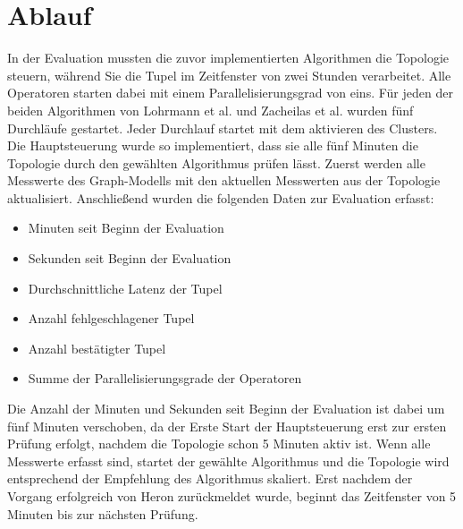 \section{Ablauf}

In der Evaluation mussten die zuvor implementierten Algorithmen die Topologie steuern, während Sie die Tupel im Zeitfenster von zwei Stunden verarbeitet.
Alle Operatoren starten dabei mit einem Parallelisierungsgrad von eins.
Für jeden der beiden Algorithmen von Lohrmann et al. und Zacheilas et al. wurden fünf Durchläufe gestartet.
Jeder Durchlauf startet mit dem aktivieren des Clusters.
Die Hauptsteuerung wurde so implementiert, dass sie alle fünf Minuten die Topologie durch den gewählten Algorithmus prüfen lässt.
Zuerst werden alle Messwerte des Graph-Modells mit den aktuellen Messwerten aus der Topologie aktualisiert.
Anschließend wurden die folgenden Daten zur Evaluation erfasst:
\begin{itemize}
\item{Minuten seit Beginn der Evaluation}
\item{Sekunden seit Beginn der Evaluation}
\item{Durchschnittliche Latenz der Tupel}
\item{Anzahl fehlgeschlagener Tupel}
\item{Anzahl bestätigter Tupel}
\item{Summe der Parallelisierungsgrade der Operatoren}
\end{itemize}
Die Anzahl der Minuten und Sekunden seit Beginn der Evaluation ist dabei um fünf Minuten verschoben, da der Erste Start der Hauptsteuerung erst zur ersten Prüfung erfolgt, nachdem die Topologie schon 5 Minuten aktiv ist.
Wenn alle Messwerte erfasst sind, startet der gewählte Algorithmus und die Topologie wird entsprechend der Empfehlung des Algorithmus skaliert.
Erst nachdem der Vorgang erfolgreich von Heron zurückmeldet wurde, beginnt das Zeitfenster von 5 Minuten bis zur nächsten Prüfung.

